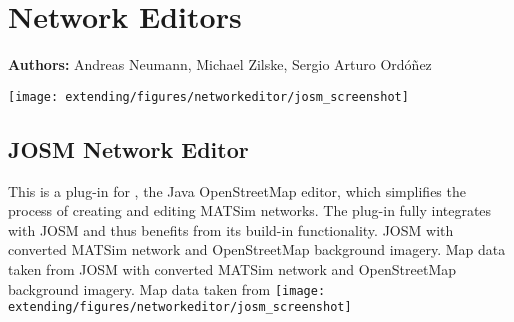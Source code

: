 \chapter{Network Editors}
\label{ch:networkeditor}

\hfill \textbf{Authors:} Andreas Neumann, Michael Zilske, Sergio Arturo Ordóñez

\begin{center} \texttt{[image: extending/figures/networkeditor/josm\_screenshot]} \end{center}


\section{JOSM Network Editor}
This is a plug-in for \citet[][]{JOSM2014}, the Java OpenStreetMap editor, which simplifies the process of creating and editing MATSim networks. The plug-in fully integrates with JOSM and thus benefits from its build-in functionality.
%
\createfigure
{JOSM with converted MATSim network and OpenStreetMap background imagery. Map data taken from \citet[][]{OpenStreetMap2014}}
{JOSM with converted MATSim network and OpenStreetMap background imagery. Map data taken from \citet[][]{OpenStreetMap2014}}
{\label{fig:networkeditor_screenshot}}
{\texttt{[image: extending/figures/networkeditor/josm\_screenshot]}}
{}

